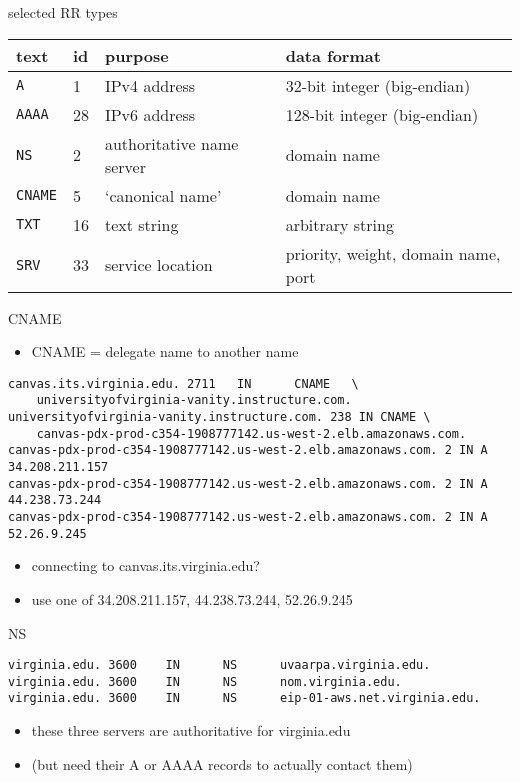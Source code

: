 \begin{frame}{selected RR types}
\begin{tabular}{l|l|l|p{6cm}}
text & id & purpose & data format \\ \hline
\texttt{A} & 1 & IPv4 address & 32-bit integer (big-endian) \\
\texttt{AAAA} & 28 & IPv6 address & 128-bit integer (big-endian) \\
\texttt{NS} & 2 & authoritative name server & domain name \\
\texttt{CNAME} & 5 & `canonical name' & domain name \\
\texttt{TXT} & 16 & text string & arbitrary string \\
\texttt{SRV} & 33 & service location & priority, weight, domain name, port \\
\end{tabular}
\end{frame}

\begin{frame}[fragile]{CNAME}
\begin{itemize}
\item CNAME = delegate name to another name
\end{itemize}
\begin{Verbatim}[fontsize=\small]
canvas.its.virginia.edu. 2711   IN      CNAME   \
    universityofvirginia-vanity.instructure.com.
universityofvirginia-vanity.instructure.com. 238 IN CNAME \
    canvas-pdx-prod-c354-1908777142.us-west-2.elb.amazonaws.com.
canvas-pdx-prod-c354-1908777142.us-west-2.elb.amazonaws.com. 2 IN A 34.208.211.157
canvas-pdx-prod-c354-1908777142.us-west-2.elb.amazonaws.com. 2 IN A 44.238.73.244
canvas-pdx-prod-c354-1908777142.us-west-2.elb.amazonaws.com. 2 IN A 52.26.9.245
\end{Verbatim}
\begin{itemize}
\item connecting to canvas.its.virginia.edu?
\item use one of 34.208.211.157, 44.238.73.244, 52.26.9.245
\end{itemize}
\end{frame}

\begin{frame}[fragile]{NS}
\begin{Verbatim}[fontsize=\small]
virginia.edu. 3600    IN      NS      uvaarpa.virginia.edu.
virginia.edu. 3600    IN      NS      nom.virginia.edu.
virginia.edu. 3600    IN      NS      eip-01-aws.net.virginia.edu.
\end{Verbatim}
\begin{itemize}
\item these three servers are authoritative for virginia.edu
\item (but need their A or AAAA records to actually contact them)
\end{itemize}
\end{frame}

